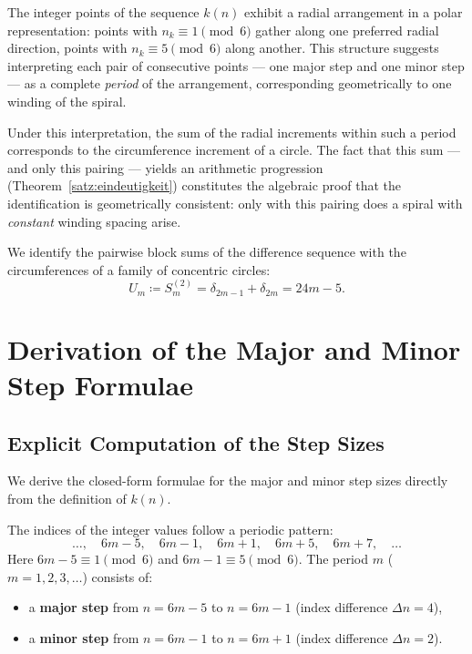 \begin{tcolorbox}[
  title={Justification of the circumference identification},
  colback=blue!3,
  colframe=blue!40!black,
  enhanced,
  breakable
]
The integer points of the sequence $k(n)$ exhibit a radial arrangement
in a polar representation: points with $n_k \equiv 1 \pmod{6}$ gather
along one preferred radial direction, points with $n_k \equiv 5 \pmod{6}$
along another. This structure suggests interpreting each pair of consecutive
points --- one major step and one minor step --- as a complete
\emph{period} of the arrangement, corresponding geometrically to one winding
of the spiral.

Under this interpretation, the sum of the radial increments
within such a period corresponds to the circumference increment of a circle.
The fact that this sum --- and only this pairing --- yields an arithmetic
progression (Theorem~\ref{satz:eindeutigkeit}) constitutes the algebraic
proof that the identification is geometrically consistent: only with this
pairing does a spiral with \emph{constant} winding spacing arise.
\end{tcolorbox}

\begin{definition}\label{def:kreisumfaenge}
We identify the pairwise block sums of the difference sequence
with the circumferences of a family of concentric circles:
\[
  U_m \coloneqq S_m^{(2)} = \delta_{2m-1} + \delta_{2m} = 24m - 5.
\]
\end{definition}

\section{Derivation of the Major and Minor Step Formulae}
\label{sec:minor_major_herleitung}

\subsection{Explicit Computation of the Step Sizes}

We derive the closed-form formulae for the major and minor step sizes
directly from the definition of $k(n)$.

The indices of the integer values follow a periodic pattern:
\[
  \ldots,\quad 6m-5,\quad 6m-1,\quad 6m+1,\quad 6m+5,\quad 6m+7,\quad\ldots
\]
Here $6m-5 \equiv 1 \pmod{6}$ and $6m-1 \equiv 5 \pmod{6}$.
The period $m$ ($m = 1, 2, 3, \ldots$) consists of:
\begin{itemize}
  \item a \textbf{major step} from $n = 6m-5$ to $n = 6m-1$
        (index difference $\Delta n = 4$),
  \item a \textbf{minor step} from $n = 6m-1$ to $n = 6m+1$
        (index difference $\Delta n = 2$).
\end{itemize}

